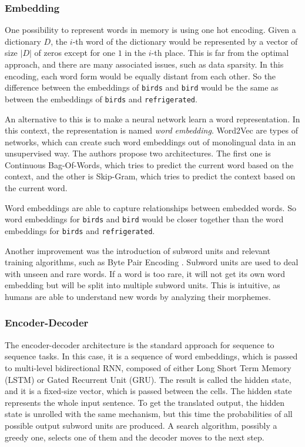 \subsubsection{Embedding}
One possibility to represent words in memory is using one hot encoding. Given a dictionary $D$, the $i$-th word of the dictionary would be represented by a vector of size $|D|$ of zeros except for one $1$ in the $i$-th place. This is far from the optimal approach, and there are many associated issues, such as data sparsity. In this encoding, each word form would be equally distant from each other. So the difference between the embeddings of \texttt{birds} and \texttt{bird} would be the same as between the embeddings of \texttt{birds} and \texttt{refrigerated}.

An alternative to this is to make a neural network learn a word representation. In this context, the representation is named \textit{word embedding}. Word2Vec \citep{word2vec} are types of networks, which can create such word embeddings out of monolingual data in an unsupervised way.
The authors propose two architectures. The first one is Continuous Bag-Of-Words, which tries to predict the current word based on the context, and the other is Skip-Gram, which tries to predict the context based on the current word. 

Word embeddings are able to capture relationships between embedded words. So word embeddings for \texttt{birds} and \texttt{bird} would be closer together than the word embeddings for \texttt{birds} and \texttt{refrigerated}.

Another improvement was the introduction of subword units and relevant training algorithms, such as Byte Pair Encoding \citep{subwords_bpe}. Subword units are used to deal with unseen and rare words. If a word is too rare, it will not get its own word embedding but will be split into multiple subword units. This is intuitive, as humans are able to understand new words by analyzing their morphemes.

\subsubsection{Encoder-Decoder}
The encoder-decoder architecture is the standard approach for sequence to sequence tasks. In this case, it is a sequence of word embeddings, which is passed to multi-level bidirectional RNN, composed of either Long Short Term Memory (LSTM) or Gated Recurrent Unit (GRU). The result is called the hidden state, and it is a fixed-size vector, which is passed between the cells. The hidden state represents the whole input sentence. To get the translated output, the hidden state is unrolled with the same mechanism, but this time the probabilities of all possible output subword units are produced. A search algorithm, possibly a greedy one, selects one of them and the decoder moves to the next step.


